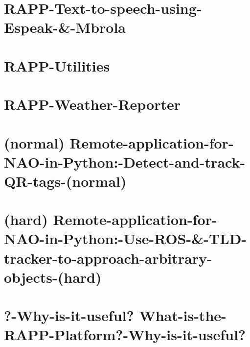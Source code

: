 \documentclass[twoside]{book}
\begin{document}
\chapter{R\-A\-P\-P-\/\-Text-\/to-\/speech-\/using-\/\-Espeak-\/\&-\/\-Mbrola}
\label{md_rapp-platform_8wiki_RAPP-Text-to-speech-using-Espeak-_6-Mbrola}
\hypertarget{md_rapp-platform_8wiki_RAPP-Text-to-speech-using-Espeak-_6-Mbrola}{}

\chapter{R\-A\-P\-P-\/\-Utilities}
\label{md_rapp-platform_8wiki_RAPP-Utilities}
\hypertarget{md_rapp-platform_8wiki_RAPP-Utilities}{}

\chapter{R\-A\-P\-P-\/\-Weather-\/\-Reporter}
\label{md_rapp-platform_8wiki_RAPP-Weather-Reporter}
\hypertarget{md_rapp-platform_8wiki_RAPP-Weather-Reporter}{}

\chapter{(normal) Remote-\/application-\/for-\/\-N\-A\-O-\/in-\/\-Python\-:-\/\-Detect-\/and-\/track-\/\-Q\-R-\/tags-\/(normal)}
\label{md_rapp-platform_8wiki_Remote-application-for-NAO-in-Python_1-Detect-and-track-QR-tags-}
\hypertarget{md_rapp-platform_8wiki_Remote-application-for-NAO-in-Python_1-Detect-and-track-QR-tags-}{}

\chapter{(hard) Remote-\/application-\/for-\/\-N\-A\-O-\/in-\/\-Python\-:-\/\-Use-\/\-R\-O\-S-\/\&-\/\-T\-L\-D-\/tracker-\/to-\/approach-\/arbitrary-\/objects-\/(hard)}
\label{md_rapp-platform_8wiki_Remote-application-for-NAO-in-Python_1-Use-ROS-_6-TLD-tracker-to-approach-arbitrary-objects-}
\hypertarget{md_rapp-platform_8wiki_Remote-application-for-NAO-in-Python_1-Use-ROS-_6-TLD-tracker-to-approach-arbitrary-objects-}{}

\chapter{?-\/\-Why-\/is-\/it-\/useful? What-\/is-\/the-\/\-R\-A\-P\-P-\/\-Platform?-\/\-Why-\/is-\/it-\/useful?}
\label{md_rapp-platform_8wiki_What-is-the-RAPP-Platform}
\hypertarget{md_rapp-platform_8wiki_What-is-the-RAPP-Platform}{}


\newpage
{}
{}
\printindex
\end{document}
